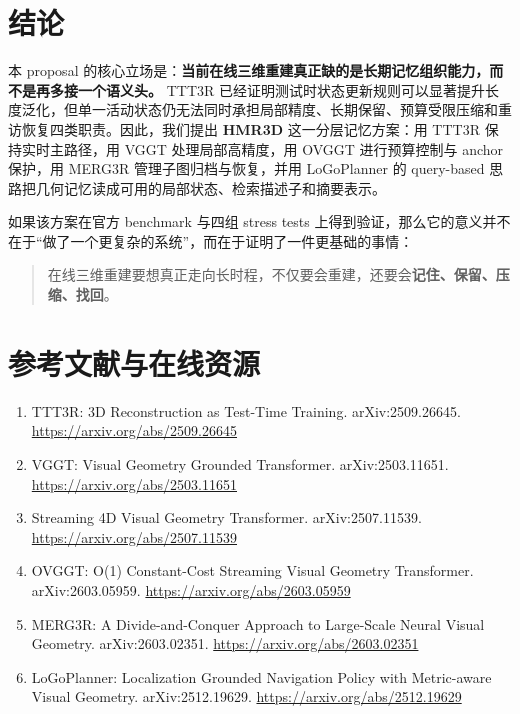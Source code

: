 \documentclass[12pt]{article}
\newcommand{\method}{\textbf{HMR3D}}
\begin{document}
\section{结论}

本 proposal 的核心立场是：\textbf{当前在线三维重建真正缺的是长期记忆组织能力，而不是再多接一个语义头。} TTT3R 已经证明测试时状态更新规则可以显著提升长度泛化，但单一活动状态仍无法同时承担局部精度、长期保留、预算受限压缩和重访恢复四类职责。因此，我们提出 \method{} 这一分层记忆方案：用 TTT3R 保持实时主路径，用 VGGT 处理局部高精度，用 OVGGT 进行预算控制与 anchor 保护，用 MERG3R 管理子图归档与恢复，并用 LoGoPlanner 的 query-based 思路把几何记忆读成可用的局部状态、检索描述子和摘要表示。

如果该方案在官方 benchmark 与四组 stress tests 上得到验证，那么它的意义并不在于“做了一个更复杂的系统”，而在于证明了一件更基础的事情：
\begin{quote}
在线三维重建要想真正走向长时程，不仅要会重建，还要会\textbf{记住、保留、压缩、找回}。
\end{quote}

\section*{参考文献与在线资源}

\begin{enumerate}
  \item TTT3R: 3D Reconstruction as Test-Time Training. arXiv:2509.26645. \url{https://arxiv.org/abs/2509.26645}
  \item VGGT: Visual Geometry Grounded Transformer. arXiv:2503.11651. \url{https://arxiv.org/abs/2503.11651}
  \item Streaming 4D Visual Geometry Transformer. arXiv:2507.11539. \url{https://arxiv.org/abs/2507.11539}
  \item OVGGT: O(1) Constant-Cost Streaming Visual Geometry Transformer. arXiv:2603.05959. \url{https://arxiv.org/abs/2603.05959}
  \item MERG3R: A Divide-and-Conquer Approach to Large-Scale Neural Visual Geometry. arXiv:2603.02351. \url{https://arxiv.org/abs/2603.02351}
  \item LoGoPlanner: Localization Grounded Navigation Policy with Metric-aware Visual Geometry. arXiv:2512.19629. \url{https://arxiv.org/abs/2512.19629}
\end{enumerate}
\end{document}
